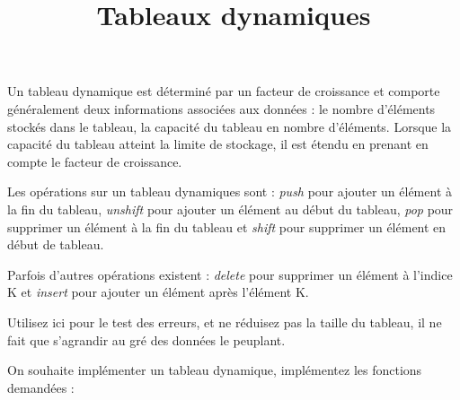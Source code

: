 \documentclass[french,a4paper,addpoints,11pt]{exam}
\title{Tableaux dynamiques}
\begin{document}
\maketitle

\ifprintanswers
\else
\begin{multicols}{2}
\fi
Un tableau dynamique est déterminé par un facteur de croissance et comporte généralement deux informations associées aux données : le nombre d'éléments stockés dans le tableau, la capacité du tableau en nombre d'éléments. Lorsque la capacité du tableau atteint la limite de stockage, il est étendu en prenant en compte le facteur de croissance.

Les opérations sur un tableau dynamiques sont : \emph{push} pour ajouter un élément à la fin du tableau, \emph{unshift} pour ajouter un élément au début du tableau, \emph{pop} pour supprimer un élément à la fin du tableau et \emph{shift} pour supprimer un élément en début de tableau.

Parfois d'autres opérations existent : \emph{delete} pour supprimer un élément à l'indice K et \emph{insert} pour ajouter un élément après l'élément K.

Utilisez ici  pour le test des erreurs, et ne réduisez pas la taille du tableau, il ne fait que s'agrandir au gré des données le peuplant.
\begin{questions}

\question On souhaite implémenter un tableau dynamique, implémentez les fonctions demandées :

\end{questions}
\end{multicols}
\end{document}
